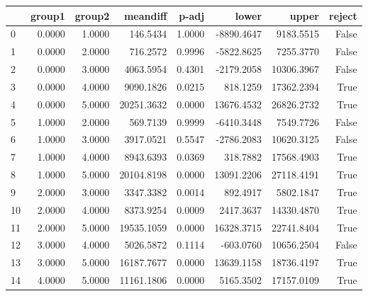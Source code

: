\begin{tabular}{lrrrrrrr}
\toprule
 & group1 & group2 & meandiff & p-adj & lower & upper & reject \\
\midrule
0 & 0.0000 & 1.0000 & 146.5434 & 1.0000 & -8890.4647 & 9183.5515 & False \\
1 & 0.0000 & 2.0000 & 716.2572 & 0.9996 & -5822.8625 & 7255.3770 & False \\
2 & 0.0000 & 3.0000 & 4063.5954 & 0.4301 & -2179.2058 & 10306.3967 & False \\
3 & 0.0000 & 4.0000 & 9090.1826 & 0.0215 & 818.1259 & 17362.2394 & True \\
4 & 0.0000 & 5.0000 & 20251.3632 & 0.0000 & 13676.4532 & 26826.2732 & True \\
5 & 1.0000 & 2.0000 & 569.7139 & 0.9999 & -6410.3448 & 7549.7726 & False \\
6 & 1.0000 & 3.0000 & 3917.0521 & 0.5547 & -2786.2083 & 10620.3125 & False \\
7 & 1.0000 & 4.0000 & 8943.6393 & 0.0369 & 318.7882 & 17568.4903 & True \\
8 & 1.0000 & 5.0000 & 20104.8198 & 0.0000 & 13091.2206 & 27118.4191 & True \\
9 & 2.0000 & 3.0000 & 3347.3382 & 0.0014 & 892.4917 & 5802.1847 & True \\
10 & 2.0000 & 4.0000 & 8373.9254 & 0.0009 & 2417.3637 & 14330.4870 & True \\
11 & 2.0000 & 5.0000 & 19535.1059 & 0.0000 & 16328.3715 & 22741.8404 & True \\
12 & 3.0000 & 4.0000 & 5026.5872 & 0.1114 & -603.0760 & 10656.2504 & False \\
13 & 3.0000 & 5.0000 & 16187.7677 & 0.0000 & 13639.1158 & 18736.4197 & True \\
14 & 4.0000 & 5.0000 & 11161.1806 & 0.0000 & 5165.3502 & 17157.0109 & True \\
\bottomrule
\end{tabular}
